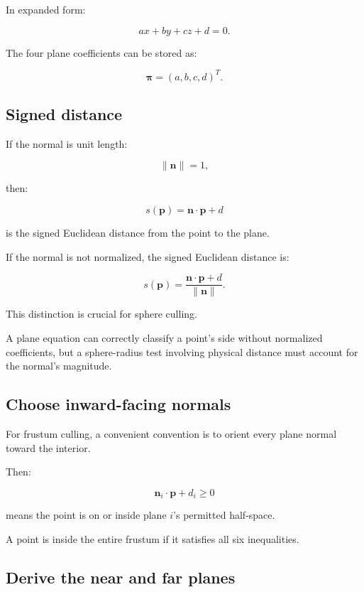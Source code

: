 In expanded form:

\[
 \boxed{ ax+by+cz+d=0 }.
\]

The four plane coefficients can be stored as:

\[
 \boxed{ \boldsymbol\pi=(a,b,c,d)^T }.
\]

\subsection{Signed distance}\label{02-foundations-ii-ch034-signed-distance}

If the normal is unit length:

\[
 \|\mathbf n\|=1,
\]

then:

\[
 \boxed{ s(\mathbf p)=\mathbf n\cdot\mathbf p+d }
\]

is the signed Euclidean distance from the point to the plane.

If the normal is not normalized, the signed Euclidean distance is:

\[
 \boxed{ s(\mathbf p)= \frac{\mathbf n\cdot\mathbf p+d}{\|\mathbf n\|} }.
\]

This distinction is crucial for sphere culling.

A plane equation can correctly classify a point's side without normalized coefficients, but a sphere-radius test involving physical distance must account for the normal's magnitude.

\subsection{Choose inward-facing normals}\label{02-foundations-ii-ch034-choose-inward-facing-normals}

For frustum culling, a convenient convention is to orient every plane normal toward the interior.

Then:

\[
 \boxed{ \mathbf n_i\cdot\mathbf p+d_i\ge0 }
\]

means the point is on or inside plane \(i\)'s permitted half-space.

A point is inside the entire frustum if it satisfies all six inequalities.

\subsection{Derive the near and far planes}\label{02-foundations-ii-ch034-derive-the-near-and-far-planes}

